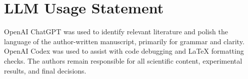 \clearpage

\section*{LLM Usage Statement}

OpenAI ChatGPT was used to identify relevant literature and polish the language of the author-written manuscript, primarily for grammar and clarity. OpenAI Codex was used to assist with code debugging and LaTeX formatting checks. The authors remain responsible for all scientific content, experimental results, and final decisions.
